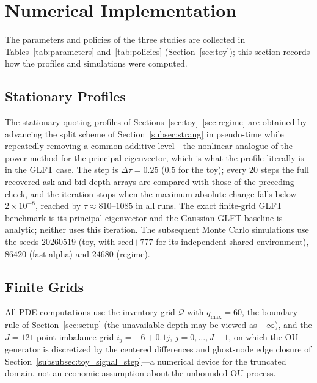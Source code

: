 \documentclass[11pt,a4paper]{article}
\newcommand{\Qcal}{\mathcal{Q}}
\theoremstyle{plain}
\theoremstyle{definition}
\begin{document}
\FloatBarrier

\section{Numerical Implementation}
\label{sec:numerical_implementation}

The parameters and policies of the three studies are collected in
Tables~\ref{tab:parameters} and~\ref{tab:policies} (Section~\ref{sec:toy});
this section records how the profiles and simulations were computed.

\subsection{Stationary Profiles}

The stationary quoting profiles of Sections~\ref{sec:toy}--\ref{sec:regime}
are obtained by advancing the split scheme of Section~\ref{subsec:strang} in
pseudo-time while repeatedly removing a common additive level---the nonlinear
analogue of the power method for the principal eigenvector, which is what the
profile literally is in the GLFT case.  The step is \(\Delta\tau=0.25\)
(\(0.5\) for the toy); every \(20\) steps the full recovered ask and bid depth
arrays are compared with those of the preceding check, and the iteration stops
when the maximum absolute change falls below \(2\times10^{-8}\), reached by
\(\tau\approx810\)--\(1085\) in all runs.  The exact finite-grid GLFT benchmark
is its principal eigenvector and the Gaussian GLFT baseline is analytic;
neither uses this iteration.  The subsequent Monte Carlo simulations use the
seeds \(20260519\) (toy, with seed\(+777\) for its independent shared
environment), \(86420\) (fast-alpha) and \(24680\) (regime).

\subsection{Finite Grids}

All PDE computations use the inventory grid \(\Qcal\) with \(q_{\max}=60\),
the boundary rule of Section~\ref{sec:setup} (the unavailable depth may be
viewed as \(+\infty\)), and the \(J=121\)-point imbalance grid
\(i_j=-6+0.1j\), \(j=0,\ldots,J-1\), on which the OU generator is discretized
by the centered differences and ghost-node edge closure of
Section~\ref{subsubsec:toy_signal_step}---a numerical device for the truncated
domain, not an economic assumption about the unbounded OU process.
\end{document}
